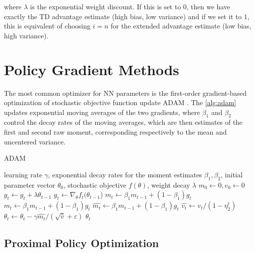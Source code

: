 where $\lambda$ is the exponential weight discount. If this is set to $0$, then we have exactly the TD advantage estimate (high bias, low variance) and if we set it to $1$, this is equivalent of choosing $i=n$ for the extended advantage estimate (low bias, high variance).

\section{Policy Gradient Methods}

The most common optimizer for \ac{NN} parameters is the first-order gradient-based optimization of stochastic objective function update ADAM \cite{kingma_adam_2017}. The \cref{alg:adam}
updates exponential moving averages of the two gradients, where $\beta_1$ and $\beta_2$ control the decay rates of the moving averages, which are then estimates of the first and second raw moment, corresponding respectively to the mean and uncentered variance.

\begin{algorithm}[H]
    \caption{ADAM}
    \label{alg:adam}
    \begin{algorithmic}[1]
        \REQUIRE learning rate $\gamma$, exponential decay rates for the moment estimates $\beta_1, \beta_2$, initial parameter vector $\theta_0$, stochastic objective $f(\theta)$, weight decay $\lambda$
        \REQUIRE $m_0 \leftarrow 0, v_0 \leftarrow 0$
        \STATE $g_t \leftarrow g_t + \lambda\theta_{t-1}$
        \ENDIF
        \STATE $g_t \leftarrow \nabla _{\theta} f_t (\theta_{t-1}$)
        \STATE $m_t \leftarrow \beta_1 m_{t-1} + (1-\beta_1)g_t$
        \STATE $m_t \leftarrow \beta_1 m_{t-1} + (1-\beta_1)g_t$
        \STATE $\hat{m_t} \leftarrow \beta_1 m_{t-1} + (1-\beta_1)g_t$
        \STATE $\hat{v_t} \leftarrow v_t / (1-\eta_2 ^t)$
        \STATE $\theta_t \leftarrow \theta_t - \gamma \hat{m_t} / (\sqrt{\hat{v}} + \varepsilon)$
        \ENDFOR
        \RETURN $\theta_t$
    \end{algorithmic}
\end{algorithm}

\subsection{Proximal Policy Optimization}

